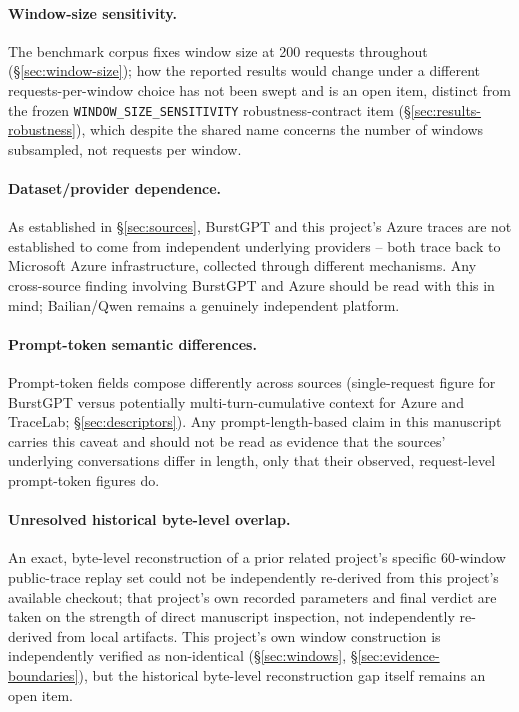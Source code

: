 \paragraph{Window-size sensitivity.} The benchmark corpus fixes window size
at 200 requests throughout (\S\ref{sec:window-size}); how the reported
results would change under a different requests-per-window choice has not
been swept and is an open item, distinct from the frozen
\texttt{WINDOW\_SIZE\_SENSITIVITY} robustness-contract item
(\S\ref{sec:results-robustness}), which despite the shared name concerns
the number of windows subsampled, not requests per window.

\paragraph{Dataset/provider dependence.} As established in
\S\ref{sec:sources}, BurstGPT and this project's Azure traces are not
established to come from independent underlying providers -- both trace
back to Microsoft Azure infrastructure, collected through different
mechanisms. Any cross-source finding involving BurstGPT and Azure should be
read with this in mind; Bailian/Qwen remains a genuinely independent
platform.

\paragraph{Prompt-token semantic differences.} Prompt-token fields compose
differently across sources (single-request figure for BurstGPT versus
potentially multi-turn-cumulative context for Azure and TraceLab;
\S\ref{sec:descriptors}). Any prompt-length-based claim in this manuscript
carries this caveat and should not be read as evidence that the sources'
underlying conversations differ in length, only that their observed,
request-level prompt-token figures do.

\paragraph{Unresolved historical byte-level overlap.} An exact,
byte-level reconstruction of a prior related project's specific 60-window
public-trace replay set could not be independently re-derived from this
project's available checkout; that project's own recorded parameters and
final verdict are taken on the strength of direct manuscript inspection,
not independently re-derived from local artifacts. This project's own
window construction is independently verified as non-identical
(\S\ref{sec:windows}, \S\ref{sec:evidence-boundaries}), but the historical
byte-level reconstruction gap itself remains an open item.

